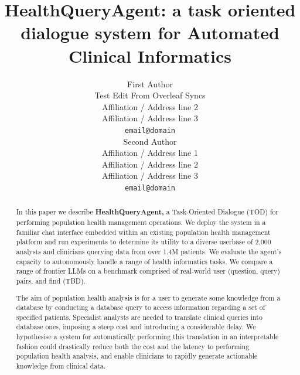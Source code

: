 \documentclass[11pt]{article}
\title{HealthQueryAgent: a task oriented dialogue system for Automated Clinical Informatics}
\author{First Author \\
  Test Edit From Overleaf Syncs \\
  Affiliation / Address line 2 \\
  Affiliation / Address line 3 \\
  \texttt{email@domain} \\\And
  Second Author \\
  Affiliation / Address line 1 \\
  Affiliation / Address line 2 \\
  Affiliation / Address line 3 \\
  \texttt{email@domain} \\}
\begin{document}
\maketitle
\begin{abstract}
In this paper we describe \textbf{HealthQueryAgent,} a Task-Oriented Dialogue (TOD) for performing population health management operations. We deploy the system in a familiar chat interface embedded within an existing population health management platform and run experiments to determine its utility to a diverse userbase of 2,000 analysts and clinicians querying data from over 1.4M patients. We evaluate the agent's capacity to autonomously handle a range of health informatics tasks. We compare a range of frontier LLMs on a benchmark comprised of real-world user (question, query) pairs, and find (TBD). %

The aim of population health analysis is for a user to generate some knowledge from a database by conducting a database query to access information regarding a set of specified patients. 
Specialist analysts are needed to translate clinical queries into database ones, imposing a steep cost and introducing a considerable delay. We hypothesise a system for automatically performing this translation in an interpretable fashion could drastically reduce both the cost and the latency to performing population health analysis, and enable clinicians to rapidly generate actionable knowledge from clinical data.

\end{abstract}
\end{document}
